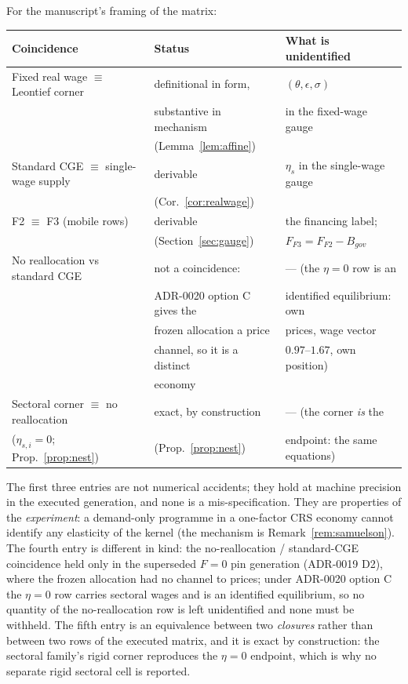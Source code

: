 \begin{corollary}[Classification]\label{cor:class}
For the manuscript's framing of the matrix:

\begin{center}
\begin{tabular}{lll}
\toprule
Coincidence & Status & What is unidentified \\
\midrule
Fixed real wage $\equiv$ Leontief corner & definitional in form, & $(\theta,\epsilon,\sigma)$ \\
 & substantive in mechanism & in the fixed-wage gauge \\
 & (Lemma~\ref{lem:affine}) & \\
Standard CGE $\equiv$ single-wage supply & derivable & $\eta_s$ in the single-wage gauge \\
 & (Cor.~\ref{cor:realwage}) & \\
F2 $\equiv$ F3 (mobile rows) & derivable & the financing label; \\
 & (Section~\ref{sec:gauge}) & $F_{F3} = F_{F2} - B_{gov}$ \\
No reallocation vs standard CGE & not a coincidence: & --- (the $\eta=0$ row is an \\
 & ADR-0020 option C gives the & identified equilibrium: own \\
 & frozen allocation a price & prices, wage vector \\
 & channel, so it is a distinct & $0.97$--$1.67$, own position) \\
 & economy & \\
Sectoral corner $\equiv$ no reallocation & exact, by construction & --- (the corner \emph{is} the \\
($\eta_{s,i} = 0$; Prop.~\ref{prop:nest}) & (Prop.~\ref{prop:nest}) & endpoint: the same equations) \\
\bottomrule
\end{tabular}
\end{center}

The first three entries are not numerical
accidents; they hold at machine precision in the executed generation, and
none is a mis-specification. They are properties of the \emph{experiment}: a
demand-only programme in a one-factor CRS economy cannot identify any
elasticity of the kernel (the mechanism is Remark~\ref{rem:samuelson}). The
fourth entry is different in kind: the no-reallocation / standard-CGE
coincidence held only in the
superseded $F = 0$ pin generation (ADR-0019 D2), where the frozen allocation
had no channel to prices; under ADR-0020 option C the $\eta = 0$ row carries
sectoral wages and is an identified equilibrium, so no quantity of the
no-reallocation row is left
unidentified and none must be withheld.
The fifth entry is an equivalence between two
\emph{closures} rather than between two rows of the executed matrix, and it is
exact by construction: the sectoral family's rigid corner reproduces the
$\eta = 0$ endpoint, which is why no separate rigid sectoral cell is reported.
\end{corollary}

